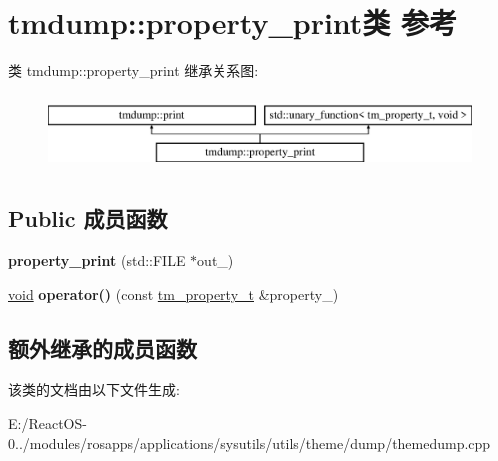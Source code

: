 \hypertarget{classtmdump_1_1property__print}{}\section{tmdump\+:\+:property\+\_\+print类 参考}
\label{classtmdump_1_1property__print}
类 tmdump\+:\+:property\+\_\+print 继承关系图\+:\begin{figure}[H]
\begin{center}
\leavevmode
\includegraphics[height=2.000000cm]{classtmdump_1_1property__print}
\end{center}
\end{figure}
\subsection*{Public 成员函数}
\begin{DoxyCompactItemize}
\item 
\mbox{\label{classtmdump_1_1property__print_a682f3c21d45bedec1dbcc45153b54377}} 
{\bfseries property\+\_\+print} (std\+::\+F\+I\+LE $\ast$out\+\_\+)
\item 
\mbox{\label{classtmdump_1_1property__print_ae55a0e5385b5539f441f18f4de3c910c}} 
\hyperlink{interfacevoid}{void} {\bfseries operator()} (const \hyperlink{structtmdump_1_1tm__property__t}{tm\+\_\+property\+\_\+t} \&property\+\_\+)
\end{DoxyCompactItemize}
\subsection*{额外继承的成员函数}


该类的文档由以下文件生成\+:\begin{DoxyCompactItemize}
\item 
E\+:/\+React\+O\+S-\/0../modules/rosapps/applications/sysutils/utils/theme/dump/themedump.\+cpp\end{DoxyCompactItemize}
